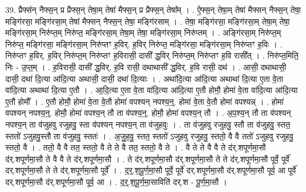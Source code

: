 \documentclass[17pt]{extarticle}
\begin{document}
39. प्रैफ्स॑न् नैफ्स॒न् प्र प्रैफ्स॒न् तेषा॒म् तेषा॑ मैफ्स॒न् प्र प्रैफ्स॒न् तेषा᳚म् । . ऐ॒फ्स॒न् तेषा॒म् तेषा॑ मैफ्सन् नैफ्स॒न् तेषा॒ मङ्गि॑रसा॒ मङ्गि॑रसा॒म् तेषा॑ मैफ्सन् नैफ्स॒न् तेषा॒ मङ्गि॑रसाम् । . तेषा॒ मङ्गि॑रसा॒ मङ्गि॑रसा॒म् तेषा॒म् तेषा॒ मङ्गि॑रसा॒म् निरु॑प्त॒म् निरु॑प्त॒ मङ्गि॑रसा॒म् तेषा॒म् तेषा॒ मङ्गि॑रसा॒म् निरु॑प्तम् । . अङ्गि॑रसा॒म् निरु॑प्त॒म् निरु॑प्त॒ मङ्गि॑रसा॒ मङ्गि॑रसा॒म् निरु॑प्तꣳ ह॒विर्. ह॒विर् निरु॑प्त॒ मङ्गि॑रसा॒ मङ्गि॑रसा॒म् निरु॑प्तꣳ ह॒विः । . निरु॑प्तꣳ ह॒विर्. ह॒विर् निरु॑प्त॒म् निरु॑प्तꣳ ह॒विरासी॒ दासी᳚ द्ध॒विर् निरु॑प्त॒म् निरु॑प्तꣳ ह॒वि रासी᳚त् । . निरु॑प्त॒मिति॒ निः - उ॒प्त॒म् । . ह॒विरासी॒ दासी᳚ द्ध॒विर्. ह॒वि रासी॒ दथाथासी᳚ द्ध॒विर्. ह॒वि रासी॒ दथ॑ । . आसी॒ दथाथासी॒ दासी॒ दथा॑ दि॒त्या आ॑दि॒त्या अथासी॒ दासी॒ दथा॑ दि॒त्याः । . अथा॑दि॒त्या आ॑दि॒त्या अथाथा॑ दि॒त्या ए॒ता वे॒ता वा॑दि॒त्या अथाथा॑ दि॒त्या ए॒तौ । . आ॒दि॒त्या ए॒ता वे॒ता वा॑दि॒त्या आ॑दि॒त्या ए॒तौ होमौ॒ होमा॑ वे॒ता वा॑दि॒त्या आ॑दि॒त्या ए॒तौ होमौ᳚ । . ए॒तौ होमौ॒ होमा॑ वे॒ता वे॒तौ होमा॑ वपश्यन् नपश्य॒न्॒. होमा॑ वे॒ता वे॒तौ होमा॑ वपश्यन्न् । . होमा॑ वपश्यन् नपश्य॒न्॒. होमौ॒ होमा॑ वपश्य॒न् तौ ता व॑पश्य॒न्॒. होमौ॒ होमा॑ वपश्य॒न् तौ । . अ॒प॒श्य॒न् तौ ता व॑पश्यन् नपश्य॒न् ता व॑जुहवु रजुहवु॒ स्ता व॑पश्यन् नपश्य॒न् ता व॑जुहवुः । . ता व॑जुहवु रजुहवु॒ स्तौ ता व॑जुहवु॒ स्तत॒ स्ततो॑ ऽजुहवु॒स्तौ ता व॑जुहवु॒ स्ततः॑ । . अ॒जु॒ह॒वु॒ स्तत॒ स्ततो॑ ऽजुहवु रजुहवु॒ स्ततो॒ वै वै ततो॑ ऽजुहवु रजुहवु॒ स्ततो॒ वै । . ततो॒ वै वै तत॒ स्ततो॒ वै ते ते वै तत॒ स्ततो॒ वै ते । . वै ते ते वै वै ते द॑र्.शपूर्णमा॒सौ द॑र्.शपूर्णमा॒सौ ते वै वै ते द॑र्.शपूर्णमा॒सौ । . ते द॑र्.शपूर्णमा॒सौ द॑र्.शपूर्णमा॒सौ ते ते द॑र्.शपूर्णमा॒सौ पूर्वे॒ पूर्वे॑ दर्.शपूर्णमा॒सौ ते ते द॑र्.शपूर्णमा॒सौ पूर्वे᳚ । . द॒र्॒.श॒पू॒र्ण॒मा॒सौ पूर्वे॒ पूर्वे॑ दर्.शपूर्णमा॒सौ द॑र्.शपूर्णमा॒सौ पूर्व॒ आ पूर्वे॑ दर्.शपूर्णमा॒सौ द॑र्.शपूर्णमा॒सौ पूर्व॒ आ । . द॒र्॒.श॒पू॒र्ण॒मा॒साविति॑ दर्.श - पू॒र्ण॒मा॒सौ । \newline
\pagebreak
{}
\end{document}
